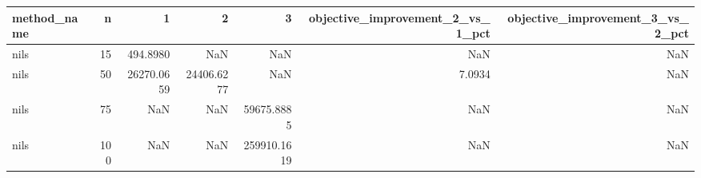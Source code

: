 \begin{tabular}{lrrrrrr}
\toprule
method_name & n & 1 & 2 & 3 & objective_improvement_2_vs_1_pct & objective_improvement_3_vs_2_pct \\
\midrule
nils & 15 & 494.8980 & NaN & NaN & NaN & NaN \\
nils & 50 & 26270.0659 & 24406.6277 & NaN & 7.0934 & NaN \\
nils & 75 & NaN & NaN & 59675.8885 & NaN & NaN \\
nils & 100 & NaN & NaN & 259910.1619 & NaN & NaN \\
\bottomrule
\end{tabular}
